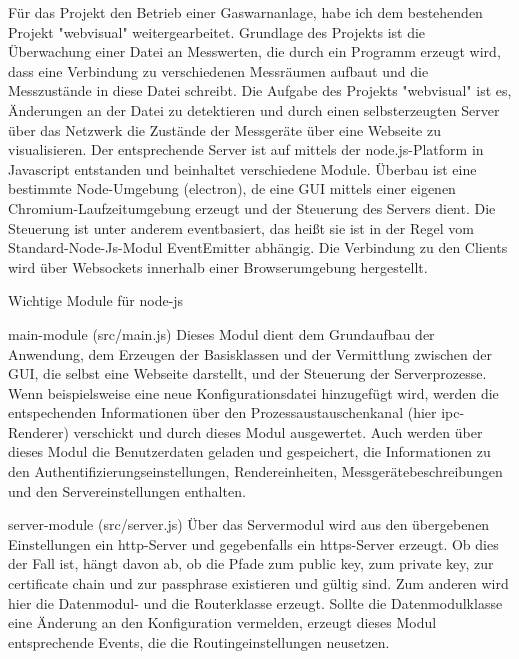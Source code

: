 Für das Projekt den Betrieb einer Gaswarnanlage, habe ich dem bestehenden Projekt "webvisual" weitergearbeitet.
Grundlage des Projekts ist die Überwachung einer Datei an Messwerten, die durch ein Programm erzeugt wird, dass eine Verbindung zu verschiedenen Messräumen aufbaut und die Messzustände in diese Datei schreibt. Die Aufgabe des Projekts "webvisual" ist es, Änderungen an der Datei zu detektieren und durch einen selbsterzeugten Server über das Netzwerk die Zustände der Messgeräte über eine Webseite zu visualisieren.
Der entsprechende Server ist auf mittels der node.js-Platform in Javascript entstanden und beinhaltet verschiedene Module. Überbau ist eine bestimmte Node-Umgebung (electron), de eine GUI mittels einer eigenen Chromium-Laufzeitumgebung erzeugt und der Steuerung des Servers dient. Die Steuerung ist unter anderem eventbasiert, das heißt sie ist in der Regel vom Standard-Node-Js-Modul EventEmitter abhängig. Die Verbindung zu den Clients wird über Websockets innerhalb einer Browserumgebung hergestellt.

Wichtige Module für node-js

main-module (src/main.js)
Dieses Modul dient dem Grundaufbau der Anwendung, dem Erzeugen der Basisklassen und der Vermittlung zwischen der GUI, die selbst eine Webseite darstellt, und der Steuerung der Serverprozesse. Wenn beispielsweise eine neue Konfigurationsdatei hinzugefügt wird, werden die entspechenden Informationen über den Prozessaustauschenkanal (hier ipc-Renderer) verschickt und durch dieses Modul ausgewertet. Auch werden über dieses Modul die Benutzerdaten geladen und gespeichert, die Informationen zu den Authentifizierungseinstellungen, Rendereinheiten, Messgerätebeschreibungen und den Servereinstellungen enthalten.

server-module (src/server.js)
Über das Servermodul wird aus den übergebenen Einstellungen ein http-Server und gegebenfalls ein https-Server erzeugt. Ob dies der Fall ist, hängt davon ab, ob die Pfade zum public key, zum private key, zur certificate chain und zur passphrase existieren und gültig sind. Zum anderen wird hier die Datenmodul- und die Routerklasse erzeugt. Sollte die Datenmodulklasse eine Änderung an den Konfiguration vermelden, erzeugt dieses Modul entsprechende Events, die die Routingeinstellungen neusetzen.

